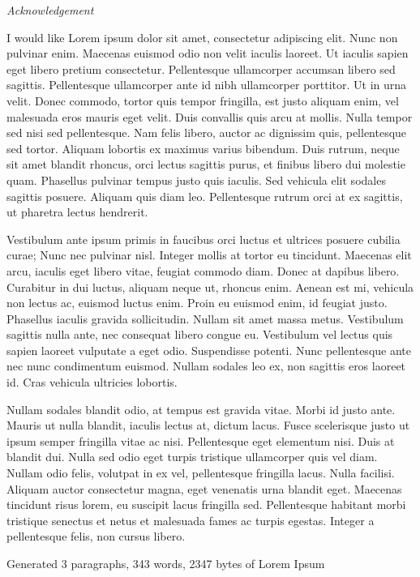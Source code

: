 
{\normalfont
\color{uniblau}
\huge\sffamily\itshape
Acknowledgement
}

I would like Lorem ipsum dolor sit amet, consectetur adipiscing elit. Nunc non pulvinar enim. Maecenas euismod odio non velit iaculis laoreet. Ut iaculis sapien eget libero pretium consectetur. Pellentesque ullamcorper accumsan libero sed sagittis. Pellentesque ullamcorper ante id nibh ullamcorper porttitor. Ut in urna velit. Donec commodo, tortor quis tempor fringilla, est justo aliquam enim, vel malesuada eros mauris eget velit. Duis convallis quis arcu at mollis. Nulla tempor sed nisi sed pellentesque. Nam felis libero, auctor ac dignissim quis, pellentesque sed tortor. Aliquam lobortis ex maximus varius bibendum. Duis rutrum, neque sit amet blandit rhoncus, orci lectus sagittis purus, et finibus libero dui molestie quam. Phasellus pulvinar tempus justo quis iaculis. Sed vehicula elit sodales sagittis posuere. Aliquam quis diam leo. Pellentesque rutrum orci at ex sagittis, ut pharetra lectus hendrerit.

Vestibulum ante ipsum primis in faucibus orci luctus et ultrices posuere cubilia curae; Nunc nec pulvinar nisl. Integer mollis at tortor eu tincidunt. Maecenas elit arcu, iaculis eget libero vitae, feugiat commodo diam. Donec at dapibus libero. Curabitur in dui luctus, aliquam neque ut, rhoncus enim. Aenean est mi, vehicula non lectus ac, euismod luctus enim. Proin eu euismod enim, id feugiat justo. Phasellus iaculis gravida sollicitudin. Nullam sit amet massa metus. Vestibulum sagittis nulla ante, nec consequat libero congue eu. Vestibulum vel lectus quis sapien laoreet vulputate a eget odio. Suspendisse potenti. Nunc pellentesque ante nec nunc condimentum euismod. Nullam sodales leo ex, non sagittis eros laoreet id. Cras vehicula ultricies lobortis.

Nullam sodales blandit odio, at tempus est gravida vitae. Morbi id justo ante. Mauris ut nulla blandit, iaculis lectus at, dictum lacus. Fusce scelerisque justo ut ipsum semper fringilla vitae ac nisi. Pellentesque eget elementum nisi. Duis at blandit dui. Nulla sed odio eget turpis tristique ullamcorper quis vel diam. Nullam odio felis, volutpat in ex vel, pellentesque fringilla lacus. Nulla facilisi. Aliquam auctor consectetur magna, eget venenatis urna blandit eget. Maecenas tincidunt risus lorem, eu suscipit lacus fringilla sed. Pellentesque habitant morbi tristique senectus et netus et malesuada fames ac turpis egestas. Integer a pellentesque felis, non cursus libero.

Generated 3 paragraphs, 343 words, 2347 bytes of Lorem Ipsum


\vfill